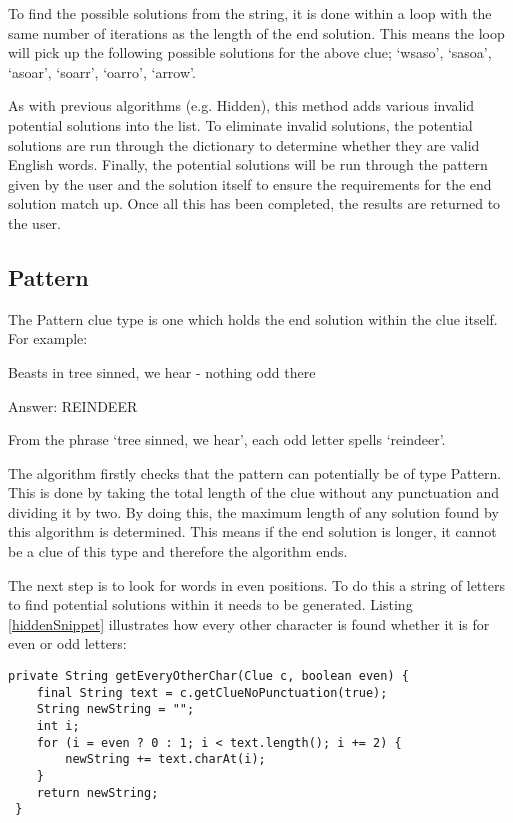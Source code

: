 To find the possible solutions from the string, it is done within a loop with the same number 
of iterations as the length of the end solution. This means the loop will pick up the 
following possible solutions for the above clue; `wsaso', `sasoa', `asoar', 
`soarr', `oarro', `arrow'.

As with previous algorithms (e.g. Hidden), this method adds various 
invalid potential solutions into the list. To eliminate invalid solutions, the 
potential solutions are run through the dictionary to determine whether 
they are valid English words. Finally, the potential solutions will be run through 
the pattern given by the user and the solution itself to ensure the 
requirements for the end solution match up. Once all this has been completed, 
the results are returned to the user. 

\subsection{Pattern}

The Pattern clue type is one which holds the end solution within the clue 
itself. For example: 

Beasts in tree sinned, we hear - nothing odd there

Answer: REINDEER

From the phrase `tree sinned, we hear', each odd letter spells `reindeer'. 

The algorithm firstly checks that the pattern can potentially be of type 
Pattern. This is done by taking the total length of the clue without any 
punctuation and dividing it by two. By doing this, the maximum length 
of any solution found by this algorithm is determined. This means  if the
 end solution is longer, it cannot be a clue of this type and therefore the
 algorithm ends. 

The next step is to look for words in even positions. To do this a string of
 letters to find potential solutions within it needs to be generated. 
 Listing \ref{hiddenSnippet} illustrates how every other character is found 
whether it is for even or odd letters:

\begin{lstlisting}[caption={INSERT CAPTION},
                   label=hiddenSnippet] 
 private String getEveryOtherChar(Clue c, boolean even) {
	final String text = c.getClueNoPunctuation(true);
	String newString = "";
	int i;
	for (i = even ? 0 : 1; i < text.length(); i += 2) {
		newString += text.charAt(i);
	}
	return newString;
 }
\end{lstlisting}

